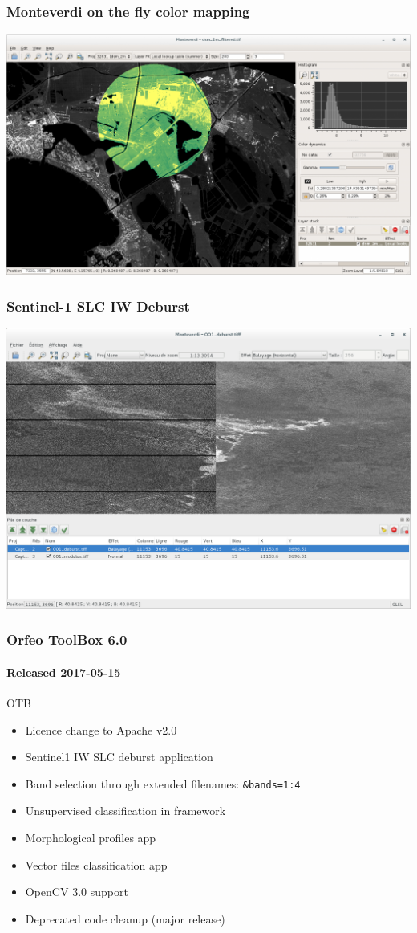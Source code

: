 \documentclass[smaller]{beamer}
\begin{document}
\begin{frame}
\frametitle{Monteverdi on the fly color mapping}
\includegraphics[width=1\textwidth]{images/monteverdi-colormapping2.png}
\end{frame}


\begin{frame}
\frametitle{Sentinel-1 SLC IW Deburst}
\includegraphics[width=1\textwidth]{images/monteverdi_S1_deburst.png}
\end{frame}

\begin{frame}
\frametitle{Orfeo ToolBox 6.0}
\framesubtitle{Released 2017-05-15}
  \begin{block}{OTB}
    \begin{itemize}
      \item Licence change to  Apache v2.0
      \item Sentinel1 IW SLC deburst application
      \item Band selection through extended filenames: \texttt{\&bands=1:4}
      \item Unsupervised classification in framework
      \item Morphological profiles app
      \item Vector files classification app
      \item OpenCV 3.0 support
      \item Deprecated code cleanup (major release)
    \end{itemize}
    \end{block}
\end{frame}
\end{document}
